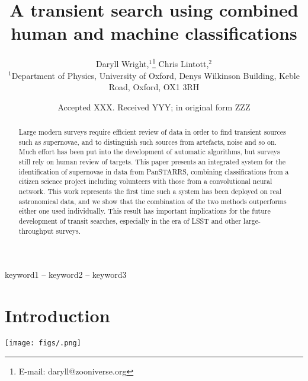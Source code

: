 \documentclass[a4paper,fleqn,usenatbib]{mnras}
\title[Human and machine classifications]{A transient search using combined human and machine classifications}
\author[D. Wright, C. Lintott et al.]{
Daryll Wright,$^{1}$\thanks{E-mail: daryll@zooniverse.org}
Chris Lintott,$^{2}$

$^{1}$Department of Physics, University of Oxford, Denys Wilkinson Building, Keble Road, Oxford, OX1 3RH
}
\date{Accepted XXX. Received YYY; in original form ZZZ}
\begin{document}
\label{firstpage}
\pagerange{\pageref{firstpage}--\pageref{lastpage}}
\maketitle

\begin{abstract}
Large modern surveys require efficient review of data in order to find transient sources such as supernovae, and to distinguish such sources from artefacts, noise and so on. Much effort has been put into the development of automatic algorithms, but surveys still rely on human review of targets. This paper presents an integrated system for the identification of supernovae in data from PanSTARRS, combining classifications from a citizen science project including volunteers with those from a convolutional neural network. This work represents the first time such a system has been deployed on real astronomical data, and we show that the combination of the two methods outperforms either one used individually. This result has important implications for the future development of transit searches, especially in the era of LSST and other large-throughput surveys. 
\end{abstract}

\begin{keywords}
keyword1 -- keyword2 -- keyword3
\end{keywords}



\section{Introduction}


\begin{figure*}
   \texttt{[image: figs/.png]}
   \caption{} 
   \label{fig:machine_dist} 
\end{figure*}


\bsp	%
\label{lastpage}
\end{document}
